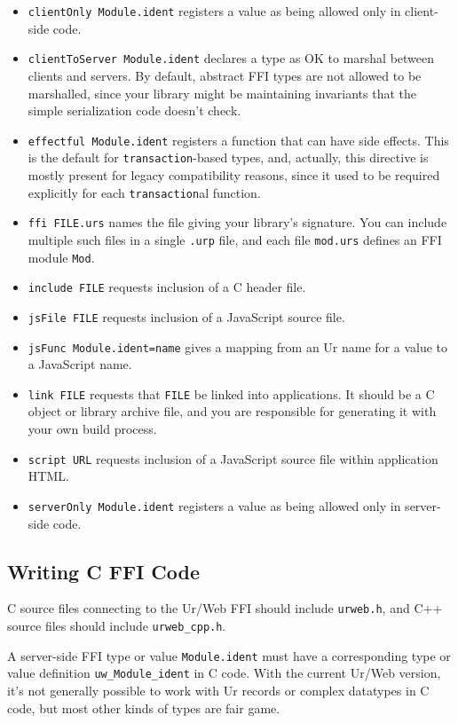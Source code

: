 \documentclass{article}
\begin{document}
\begin{itemize}
\item \texttt{clientOnly Module.ident} registers a value as being allowed only in client-side code.
\item \texttt{clientToServer Module.ident} declares a type as OK to marshal between clients and servers.  By default, abstract FFI types are not allowed to be marshalled, since your library might be maintaining invariants that the simple serialization code doesn't check.
\item \texttt{effectful Module.ident} registers a function that can have side effects.  This is the default for \texttt{transaction}-based types, and, actually, this directive is mostly present for legacy compatibility reasons, since it used to be required explicitly for each \texttt{transaction}al function.
\item \texttt{ffi FILE.urs} names the file giving your library's signature.  You can include multiple such files in a single \texttt{.urp} file, and each file \texttt{mod.urs} defines an FFI module \texttt{Mod}.
\item \texttt{include FILE} requests inclusion of a C header file.
\item \texttt{jsFile FILE} requests inclusion of a JavaScript source file.
\item \texttt{jsFunc Module.ident=name} gives a mapping from an Ur name for a value to a JavaScript name.
\item \texttt{link FILE} requests that \texttt{FILE} be linked into applications.  It should be a C object or library archive file, and you are responsible for generating it with your own build process.
\item \texttt{script URL} requests inclusion of a JavaScript source file within application HTML.
\item \texttt{serverOnly Module.ident} registers a value as being allowed only in server-side code.
\end{itemize}

\subsection{Writing C FFI Code}

C source files connecting to the Ur/Web FFI should include \texttt{urweb.h}, and C++ source files should include \texttt{urweb\_cpp.h}.

A server-side FFI type or value \texttt{Module.ident} must have a corresponding type or value definition \texttt{uw\_Module\_ident} in C code.  With the current Ur/Web version, it's not generally possible to work with Ur records or complex datatypes in C code, but most other kinds of types are fair game.
\end{document}
